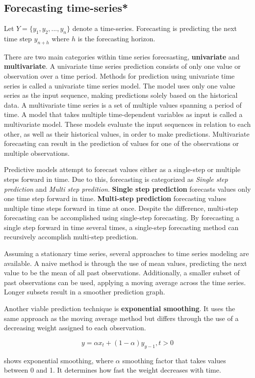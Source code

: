 
\subsection{Forecasting time-series*}
\label{section:BT:forecasting-time-series}
Let  $Y = \{y_1, y_2, ..., y_n\}$ denote a time-series.
Forecasting is predicting the next time step $y_{n+h}$ where $h$ is the forecasting horizon.

There are two main categories within time series forecsasting, \textbf{univariate} and \textbf{multivariate}.
A univariate time series prediction consists of only one value or observation over a time period.
Methods for prediction using univariate time series is called a univariate time series model.
The model uses only one value series as the input sequence, making predictions solely based on the historical data.
A multivariate time series is a set of multiple values spanning a period of time.
A model that takes multiple time-dependent variables as input is called a multivariate model.
These models evaluate the input sequences in relation to each other, as well as their historical values, in order to make predictions.
Multivariate forecasting can result in the prediction of values for one of the observations or multiple observations.

Predictive models attempt to forecast values either as a single-step or multiple steps forward in time.
Due to this, forecasting is categorized as \textit{Single step prediction} and \textit{Multi step predition}.
\textbf{Single step prediction} forecasts values only one time step forward in time.
\textbf{Multi-step prediction} forecasting values multiple time steps forward in time at once.
Despite the difference, multi-step forecasting can be accomplished using single-step forecasting.
By forecasting a single step forward in time several times, a single-step forecasting method can recursively accomplish multi-step prediction.


Assuming a stationary time series, several approaches to time series modeling are available.
A naive method is through the use of mean values, predicting the next value to be the mean of all past observations.
Additionally, a smaller subset of past observations can be used, applying a moving average across the time series.
Longer subsets result in a smoother prediction graph.

Another viable prediction technique is \textbf{exponential smoothing}.
It uses the same approach as the moving average method but differs through the use of
a decreasing weight assigned to each observation.

\begin{equation}
  \label{eq:exponential_smoothing}
  y = \alpha x_t + (1 - \alpha)y_{y-1}, t > 0
\end{equation}

shows exponential smoothing, where $\alpha$ smoothing factor
that takes values between 0 and 1. It determines how fast the weight decreases with time.



